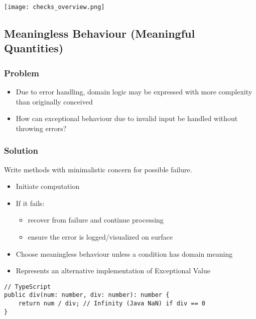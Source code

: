 \texttt{[image: checks\_overview.png]}



\subsection{Meaningless Behaviour (Meaningful Quantities)}
\subsubsection{Problem}
\begin{itemize}
    \item Due to error handling, domain logic may be expressed with more complexity than originally conceived
    \item How can exceptional behaviour due to invalid input be handled without throwing errors?
\end{itemize}
\subsubsection{Solution}
Write methods with minimalistic concern for possible failure.
\begin{itemize}
    \item Initiate computation
    \item If it fails:
    \begin{itemize}
        \item recover from failure and continue processing
        \item ensure the error is logged/visualized on surface
    \end{itemize}
    \item Choose meaningless behaviour unless a condition has domain meaning
    \item Represents an alternative implementation of Exceptional Value
\end{itemize}
\begin{lstlisting}
// TypeScript
public div(num: number, div: number): number {
    return num / div; // Infinity (Java NaN) if div == 0
}
\end{lstlisting}

